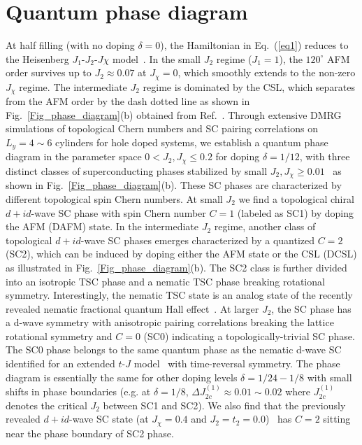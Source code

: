 \documentclass[aps,prx,reprint,superscriptaddress,showpacs]{revtex4-2}
\newcommand{\oim}[1]{{\color{blue} #1}}
\begin{document}
\section{Quantum phase diagram}
\label{phase_diagram}
At half filling (with no doping $\delta=0$), the Hamiltonian in Eq.~(\ref{eq1}) reduces to the Heisenberg $J_{1}$-$J_{2}$-$J{\chi}$ model~\cite{gong2017global}. 
In the small $J_{2}$ regime ($J_{1}=1$), the $120^{\circ}$ AFM order survives up to $J_{2}\approx 0.07$ at $J_{\chi}=0$, which
smoothly extends to the non-zero $J_{\chi}$ regime. The intermediate $J_{2}$ regime is dominated by the CSL, which separates from the AFM order by the dash dotted line as shown in Fig.~\ref{Fig_phase_diagram}(b) obtained from Ref.~\cite{ wietek2017chiral,gong2017global}. Through extensive DMRG simulations of topological Chern numbers  and SC pairing correlations on $L_{y}=4\sim 6$  cylinders for hole doped systems, we establish a quantum phase diagram in the parameter space $0<J_{2}, J_{\chi} \leq 0.2$ for doping $\delta=1/12$, with three distinct classes of superconducting phases stabilized by  small $J_{2}, J_{\chi} \geq  0.01$~\cite{note1} as shown in Fig.~\ref{Fig_phase_diagram}(b). These SC phases are characterized by  different topological spin Chern numbers. \oim{At small $J_{2}$ we find a topological chiral $d+id$-wave SC phase with spin Chern number $C = 1$ (labeled as SC1) by doping the AFM  (DAFM) state. 
In the intermediate $J_{2}$ regime, another class of topological $d+id$-wave SC phases emerges  characterized by a quantized $C = 2$ (SC2), which can be induced by doping either the AFM state or the CSL (DCSL) as illustrated in Fig.~\ref{Fig_phase_diagram}(b). 
The SC2 class is further divided into an isotropic TSC phase and a nematic TSC phase breaking rotational symmetry.
Interestingly,  the nematic TSC state is an analog state
of the recently revealed nematic fractional quantum Hall effect~\cite{haldane2011geometrical,you2014theory, yang2017anisotropic,regnault2017evidence}. 
At larger $J_{2}$, the SC phase has a d-wave symmetry with anisotropic pairing correlations  breaking the lattice rotational symmetry and $C=0$ (SC0) indicating a topologically-trivial SC phase.  The SC0 phase  belongs to the same quantum phase as the nematic d-wave SC identified for an extended $t$-$J$ model~\cite{jiang2021superconductivity} with time-reversal symmetry.} The phase  diagram is essentially the same for other doping levels $\delta=1/24-1/8$ with small shifts in phase boundaries (e.g. at $\delta=1/8$,  $\Delta J_{2c}^{(1)}\approx  0.01\sim 0.02$ where $J_{2c}^{(1)}$ denotes the critical $J_{2}$ between SC1 and SC2). We also find that the previously revealed $d+id$-wave SC state (at $J_{\chi}=0.4$ and $J_{2}=t_{2}=0.0$)~\cite{jiang2020topological} has $C=2$ sitting near the phase boundary of SC2  phase.
\end{document}
